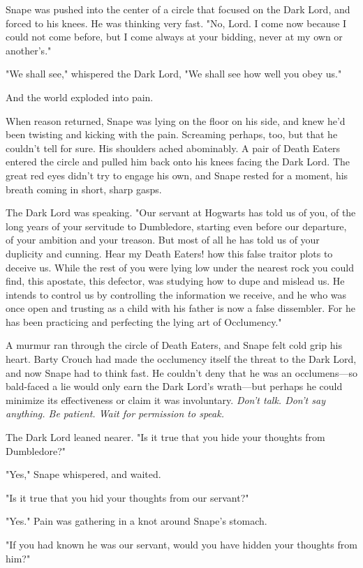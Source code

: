 Snape was pushed into the center of a circle that focused on the Dark Lord, and forced to his knees. He was thinking very fast. "No, Lord. I come now because I could not come before, but I come always at your bidding, never at my own or another's."

"We shall see," whispered the Dark Lord, "We shall see how well you obey us."

And the world exploded into pain.

When reason returned, Snape was lying on the floor on his side, and knew he'd been twisting and kicking with the pain. Screaming perhaps, too, but that he couldn't tell for sure. His shoulders ached abominably. A pair of Death Eaters entered the circle and pulled him back onto his knees facing the Dark Lord. The great red eyes didn't try to engage his own, and Snape rested for a moment, his breath coming in short, sharp gasps.

The Dark Lord was speaking. "Our servant at Hogwarts has told us of you, of the long years of your servitude to Dumbledore, starting even before our departure, of your ambition and your treason. But most of all he has told us of your duplicity and cunning. Hear my Death Eaters! how this false traitor plots to deceive us. While the rest of you were lying low under the nearest rock you could find, this apostate, this defector, was studying how to dupe and mislead us. He intends to control us by controlling the information we receive, and he who was once open and trusting as a child with his father is now a false dissembler. For he has been practicing and perfecting the lying art of Occlumency."

A murmur ran through the circle of Death Eaters, and Snape felt cold grip his heart. Barty Crouch had made the occlumency itself the threat to the Dark Lord, and now Snape had to think fast. He couldn't deny that he was an occlumens—so bald-faced a lie would only earn the Dark Lord's wrath—but perhaps he could minimize its effectiveness or claim it was involuntary. \emph{Don't talk. Don't say anything. Be patient. Wait for permission to speak.}

The Dark Lord leaned nearer. "Is it true that you hide your thoughts from Dumbledore?"

"Yes," Snape whispered, and waited.

"Is it true that you hid your thoughts from our servant?"

"Yes." Pain was gathering in a knot around Snape's stomach.

"If you had known he was our servant, would you have hidden your thoughts from him?"

